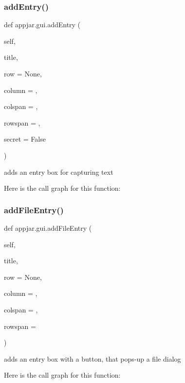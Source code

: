 \subsubsection{\texorpdfstring{add\+Entry()}{addEntry()}}
{\footnotesize\ttfamily def appjar.\+gui.\+add\+Entry (\begin{DoxyParamCaption}\item[{}]{self,  }\item[{}]{title,  }\item[{}]{row = {\ttfamily None},  }\item[{}]{column = {},  }\item[{}]{colspan = {},  }\item[{}]{rowspan = {},  }\item[{}]{secret = {\ttfamily False} }\end{DoxyParamCaption})}

\begin{DoxyVerb}adds an entry box for capturing text \end{DoxyVerb}
 Here is the call graph for this function\+:
\mbox{\label{classappjar_1_1gui_a78a624b2ea19a173f830ccca80806002}} 
\subsubsection{\texorpdfstring{add\+File\+Entry()}{addFileEntry()}}
{\footnotesize\ttfamily def appjar.\+gui.\+add\+File\+Entry (\begin{DoxyParamCaption}\item[{}]{self,  }\item[{}]{title,  }\item[{}]{row = {\ttfamily None},  }\item[{}]{column = {},  }\item[{}]{colspan = {},  }\item[{}]{rowspan = {} }\end{DoxyParamCaption})}

\begin{DoxyVerb}adds an entry box with a button, that pops-up a file dialog \end{DoxyVerb}
 Here is the call graph for this function\+:
\mbox{\label{classappjar_1_1gui_aebdbd28fa436f476eee09361d80e44f7}} 
